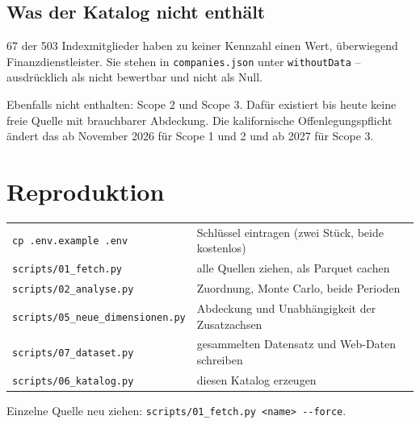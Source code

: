 \documentclass[11pt,a4paper]{article}
\begin{document}
\subsection{Was der Katalog nicht enthält}

67 der 503 Indexmitglieder haben zu keiner Kennzahl einen Wert, überwiegend Finanzdienstleister. Sie stehen in \texttt{companies.json} unter \texttt{withoutData} -- ausdrücklich als \glqq nicht bewertbar\grqq{} und nicht als Null.

Ebenfalls nicht enthalten: Scope 2 und Scope 3. Dafür existiert bis heute keine freie Quelle mit brauchbarer Abdeckung. Die kalifornische Offenlegungspflicht ändert das ab November 2026 für Scope 1 und 2 und ab 2027 für Scope 3.

\section{Reproduktion}

\begin{center}\small
\begin{tabular}{lP{9.4cm}}
\toprule
\texttt{cp .env.example .env} & Schlüssel eintragen (zwei Stück, beide kostenlos) \\
\texttt{scripts/01\_fetch.py} & alle Quellen ziehen, als Parquet cachen \\
\texttt{scripts/02\_analyse.py} & Zuordnung, Monte Carlo, beide Perioden \\
\texttt{scripts/05\_neue\_dimensionen.py} & Abdeckung und Unabhängigkeit der Zusatzachsen \\
\texttt{scripts/07\_dataset.py} & gesammelten Datensatz und Web-Daten schreiben \\
\texttt{scripts/06\_katalog.py} & diesen Katalog erzeugen \\
\bottomrule
\end{tabular}
\end{center}

Einzelne Quelle neu ziehen: \texttt{scripts/01\_fetch.py <name> -{}-force}.
\end{document}
